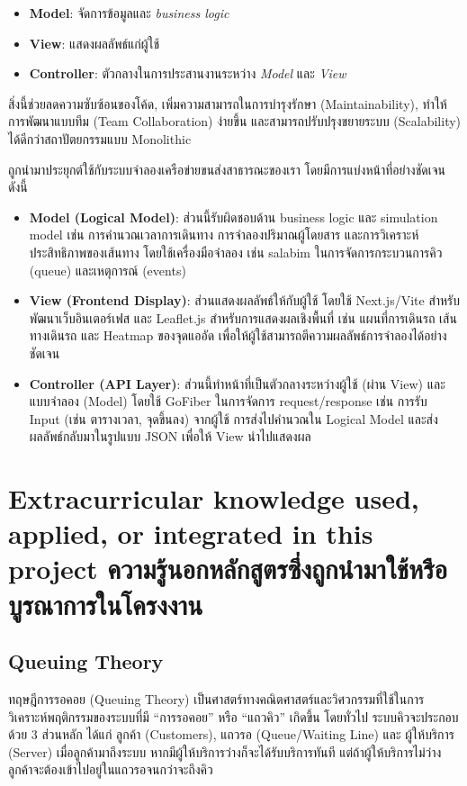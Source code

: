 \begin{itemize}
  \item \textbf{Model}: จัดการข้อมูลและ \textit{business logic}
  \item \textbf{View}: แสดงผลลัพธ์แก่ผู้ใช้
  \item \textbf{Controller}: ตัวกลางในการประสานงานระหว่าง \textit{Model} และ \textit{View}
\end{itemize}

สิ่งนี้ช่วยลดความซับซ้อนของโค้ด, เพิ่มความสามารถในการบำรุงรักษา (Maintainability), 
ทำให้การพัฒนาแบบทีม (Team Collaboration) ง่ายขึ้น และสามารถปรับปรุงขยายระบบ (Scalability) 
ได้ดีกว่าสถาปัตยกรรมแบบ Monolithic

ถูกนำมาประยุกต์ใช้กับระบบจำลองเครือข่ายขนส่งสาธารณะของเรา โดยมีการแบ่งหน้าที่อย่างชัดเจน ดังนี้
\begin{itemize}
  \item \textbf{Model (Logical Model)}: 
  ส่วนนี้รับผิดชอบด้าน business logic และ simulation model
  เช่น การคำนวณเวลาการเดินทาง การจำลองปริมาณผู้โดยสาร 
  และการวิเคราะห์ประสิทธิภาพของเส้นทาง โดยใช้เครื่องมือจำลอง 
  เช่น salabim ในการจัดการกระบวนการคิว (queue) และเหตุการณ์ (events) 

  \item \textbf{View (Frontend Display)}: 
  ส่วนแสดงผลลัพธ์ให้กับผู้ใช้ โดยใช้ Next.js/Vite
  สำหรับพัฒนาเว็บอินเตอร์เฟส และ Leaflet.js สำหรับการแสดงผลเชิงพื้นที่ 
  เช่น แผนที่การเดินรถ เส้นทางเดินรถ และ Heatmap ของจุดแออัด 
  เพื่อให้ผู้ใช้สามารถตีความผลลัพธ์การจำลองได้อย่างชัดเจน

  \item \textbf{Controller (API Layer)}: 
  ส่วนนี้ทำหน้าที่เป็นตัวกลางระหว่างผู้ใช้ (ผ่าน View) และแบบจำลอง (Model) 
  โดยใช้ GoFiber ในการจัดการ request/response
  เช่น การรับ Input (เช่น ตารางเวลา, จุดขึ้นลง) จากผู้ใช้ 
  การส่งไปคำนวณใน Logical Model และส่งผลลัพธ์กลับมาในรูปแบบ JSON
  เพื่อให้ View นำไปแสดงผล
\end{itemize}

\section{\ifenglish%
Extracurricular knowledge used, applied, or integrated in this project
\else%
ความรู้นอกหลักสูตรซึ่งถูกนำมาใช้หรือบูรณาการในโครงงาน
\fi
}

\subsection{Queuing Theory}
ทฤษฎีการรอคอย (Queuing Theory) เป็นศาสตร์ทางคณิตศาสตร์และวิศวกรรมที่ใช้ในการวิเคราะห์พฤติกรรมของระบบที่มี 
“การรอคอย” หรือ “แถวคิว” เกิดขึ้น โดยทั่วไป ระบบคิวจะประกอบด้วย 3 ส่วนหลัก ได้แก่ ลูกค้า (Customers), 
แถวรอ (Queue/Waiting Line) และ ผู้ให้บริการ (Server) เมื่อลูกค้ามาถึงระบบ หากมีผู้ให้บริการว่างก็จะได้รับบริการทันที 
แต่ถ้าผู้ให้บริการไม่ว่าง ลูกค้าจะต้องเข้าไปอยู่ในแถวรอจนกว่าจะถึงคิว

